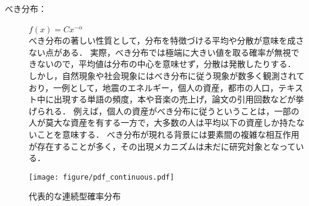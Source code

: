 \begin{description}
\item[べき分布：]$ \displaystyle f(x)= Cx^{-\alpha} $　\\[10pt]
%
べき分布の著しい性質として，分布を特徴づける平均や分散が意味を成さない点がある．
%
実際，べき分布では極端に大きい値を取る確率が無視できないので，平均値は分布の中心を意味せず，分散は発散したりする．
%
しかし，自然現象や社会現象にはべき分布に従う現象が数多く観測されており，一例として，地震のエネルギー，個人の資産，都市の人口，テキスト中に出現する単語の頻度，本や音楽の売上げ，論文の引用回数などが挙げられる．
%
例えば，個人の資産がべき分布に従うということは，一部の人が莫大な資産を有する一方で，大多数の人は平均以下の資産しか持たないことを意味する．
%
べき分布が現れる背景には要素間の複雑な相互作用が存在することが多く，その出現メカニズムは未だに研究対象となっている\cite{i, j}．
%
\end{description}
%

%
\begin{figure}[H]
	\centering
	\texttt{[image: figure/pdf\_continuous.pdf]}
	\caption{代表的な連続型確率分布}
	\label{fig:pdf_dscrete}
\end{figure}
%



